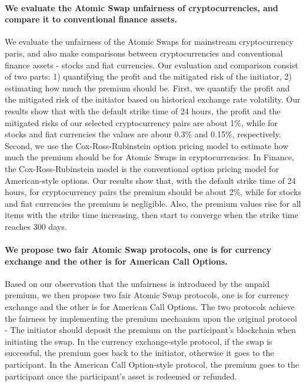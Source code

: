 \paragraph{We evaluate the Atomic Swap unfairness of cryptocurrencies, and compare it to conventional finance assets.}
We evaluate the unfairness of the Atomic Swaps for mainstream cryptocurrency paris, and also make comparisons between cryptocurrencies and conventional finance assets - stocks and fiat currencies.
Our evaluation and comparison consist of two parts: 1) quantifying the profit and the mitigated risk of the initiator, 2) estimating how much the premium should be.
First, we quantify the profit and the mitigated risk of the initiator based on historical exchange rate volatility.
Our results show that with the default strike time of 24 hours, the profit and the mitigated risks of our selected cryptocurrency pairs are about 1\%, while for stocks and fiat currencies the values are abour 0.3\% and 0.15\%, respectively.
Second, we use the Cox-Ross-Rubinstein option pricing model to estimate how much the premium should be for Atomic Swaps in cryptocurrencies.
In Finance, the Cox-Ross-Rubinstein model is the conventional option pricing model for American-style options.
Our results show that, with the default strike time of 24 hours, for cryptocurrency pairs the premium should be about 2\%, while for stocks and fiat currencies the premium is negligible.
Also, the premium values rise for all items with the strike time increasing, then start to converge when the strike time reaches 300 days.

\paragraph{We propose two fair Atomic Swap protocols, one is for currency exchange and the other is for American Call Options.}
Based on our observation that the unfairness is introduced by the unpaid premium,
we then propose two fair Atomic Swap protocols, one is for currency exchange and the other is for American Call Options.
The two protocols achieve the fairness by implementing the premium mechanism upon the original protocol - The initiator should deposit the premium on the participant's blockchain when initiating the swap.
In the currency exchange-style protocol, if the swap is successful, the premium goes back to the initiator, otherwise it goes to the participant.
In the American Call Option-style protocol, the premium goes to the participant once the participant's asset is redeemed or refunded.

